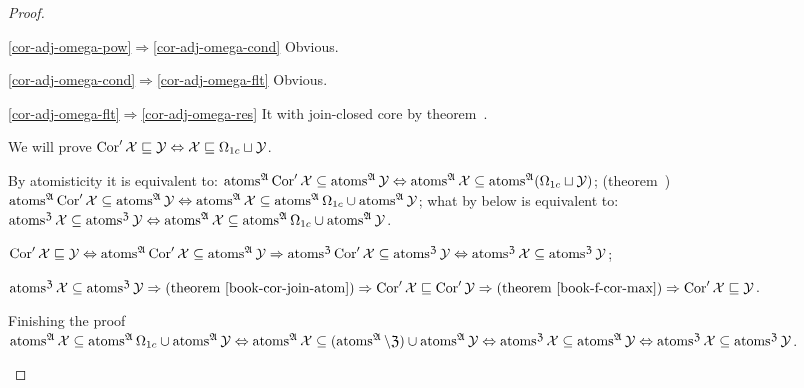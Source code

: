 \begin{proof}
~
\begin{widedisorder}
\item[\ref{cor-adj-omega-pow}$\Rightarrow$\ref{cor-adj-omega-cond}]
Obvious.

\item[\ref{cor-adj-omega-cond}$\Rightarrow$\ref{cor-adj-omega-flt}]
Obvious.

\item[\ref{cor-adj-omega-flt}$\Rightarrow$\ref{cor-adj-omega-res}]
It with join-closed core by theorem~.

We will prove $\operatorname{Cor}'\mathcal{X} \sqsubseteq \mathcal{Y} \Leftrightarrow
\mathcal{X} \sqsubseteq \Omega_{1c} \sqcup \mathcal{Y}$.

By atomisticity it is equivalent to:
$\operatorname{atoms}^{\mathfrak{A}}\operatorname{Cor}'\mathcal{X} \subseteq \operatorname{atoms}^{\mathfrak{A}}\mathcal{Y}
\Leftrightarrow
\operatorname{atoms}^{\mathfrak{A}}\mathcal{X} \subseteq \operatorname{atoms}^{\mathfrak{A}}(\Omega_{1c} \sqcup \mathcal{Y})$;
(theorem~)
$\operatorname{atoms}^{\mathfrak{A}}\operatorname{Cor}'\mathcal{X} \subseteq \operatorname{atoms}^{\mathfrak{A}}\mathcal{Y}
\Leftrightarrow
\operatorname{atoms}^{\mathfrak{A}}\mathcal{X} \subseteq \operatorname{atoms}^{\mathfrak{A}}\Omega_{1c} \cup \operatorname{atoms}^{\mathfrak{A}}\mathcal{Y}$;
what by below is equivalent to:
$\operatorname{atoms}^{\mathfrak{Z}}  \mathcal{X} \subseteq
\operatorname{atoms}^{\mathfrak{Z}}  \mathcal{Y} \Leftrightarrow
\operatorname{atoms}^{\mathfrak{A}}  \mathcal{X} \subseteq \operatorname{atoms}^{\mathfrak{A}}
\Omega_{1c} \cup \operatorname{atoms}^{\mathfrak{A}}  \mathcal{Y}$.

$\operatorname{Cor}' \mathcal{X} \sqsubseteq \mathcal{Y} \Leftrightarrow
\operatorname{atoms}^{\mathfrak{A}} \operatorname{Cor}' \mathcal{X} \subseteq
\operatorname{atoms}^{\mathfrak{A}}  \mathcal{Y} \Rightarrow
\operatorname{atoms}^{\mathfrak{Z}} \operatorname{Cor}' \mathcal{X} \subseteq
\operatorname{atoms}^{\mathfrak{Z}}  \mathcal{Y} \Leftrightarrow
\operatorname{atoms}^{\mathfrak{Z}}  \mathcal{X} \subseteq \operatorname{atoms}^{\mathfrak{Z}}
\mathcal{Y}$;

$\atoms^{\mathfrak{Z}}  \mathcal{X} \subseteq
\atoms^{\mathfrak{Z}}  \mathcal{Y} \Rightarrow
\text{(theorem~\bookref{cor-join-atom})} \Rightarrow
\Cor' \mathcal{X}
\sqsubseteq \Cor' \mathcal{Y} \Rightarrow
\text{(theorem~\bookref{f-cor-max})} \Rightarrow
\Cor' \mathcal{X} \sqsubseteq \mathcal{Y}$.

Finishing the proof
$\operatorname{atoms}^{\mathfrak{A}} \mathcal{X} \subseteq \operatorname{atoms}^{\mathfrak{A}}
\Omega_{1c} \cup \operatorname{atoms}^{\mathfrak{A}} \mathcal{Y} \Leftrightarrow
\operatorname{atoms}^{\mathfrak{A}} \mathcal{X} \subseteq
(\operatorname{atoms}^{\mathfrak{A}} \setminus \mathfrak{Z})
\cup \operatorname{atoms}^{\mathfrak{A}} \mathcal{Y} \Leftrightarrow
\operatorname{atoms}^{\mathfrak{Z}} \mathcal{X} \subseteq
\operatorname{atoms}^{\mathfrak{A}} \mathcal{Y} \Leftrightarrow
\operatorname{atoms}^{\mathfrak{Z}} \mathcal{X} \subseteq
\operatorname{atoms}^{\mathfrak{Z}} \mathcal{Y}$.
\end{widedisorder}
\end{proof}

